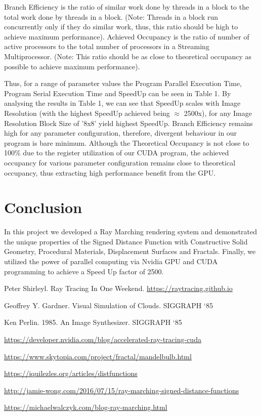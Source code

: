 \documentclass[sigconf, nonacm]{acmart}
\begin{document}
Branch Efficiency is the ratio of similar work done by threads in a block to the total work done by threads in a block. (Note: Threads in a block run concurrently only if they do similar work, thus, this ratio should be high to achieve maximum performance). Achieved Occupancy is the ratio of number of active processors to the total number of processors in a Streaming Multiprocessor. (Note: This ratio should be as close to theoretical occupancy as possible to achieve maximum performance).

Thus, for a range of parameter values the Program Parallel Execution Time, Program Serial Execution Time and SpeedUp can be seen in Table 1. By analysing the results in Table 1, we can see that SpeedUp scales with Image Resolution (with the highest SpeedUp achieved being $\approx$ 2500x), for any Image Resolution Block Size of '8x8' yield highest SpeedUp. Branch Efficiency remains high for any parameter configuration, therefore, divergent behaviour in our program is bare minimum. Although the Theoretical Occupancy is not close to 100{\%} due to the register utilization of our CUDA program, the achieved occupancy for various parameter configuration remains close to theoretical occupancy, thus extracting high performance benefit from the GPU. 

\FloatBarrier

\section{Conclusion}

In this project we developed a Ray Marching rendering system and demonstrated the unique properties of the Signed Distance Function with  Constructive Solid Geometry, Procedural Materials, Displacement Surfaces and Fractals. Finally, we utilized the power of parallel computing via Nvidia GPU and CUDA programming to achieve a Speed Up factor of 2500.

\begin{thebibliography}{}
Peter Shirleyl. Ray Tracing In One Weekend. \url{https://raytracing.github.io}

Geoffrey Y. Gardner. Visual Simulation of Clouds. SIGGRAPH ‘85

Ken Perlin. 1985. An Image Synthesizer. SIGGRAPH ‘85

  \url{https://developer.nvidia.com/blog/accelerated-ray-tracing-cuda}

  \url{https://www.skytopia.com/project/fractal/mandelbulb.html}

  \url{https://iquilezles.org/articles/distfunctions}

  \url{http://jamie-wong.com/2016/07/15/ray-marching-signed-distance-functions}

  \url{https://michaelwalczyk.com/blog-ray-marching.html}
\end{thebibliography}
\end{document}
